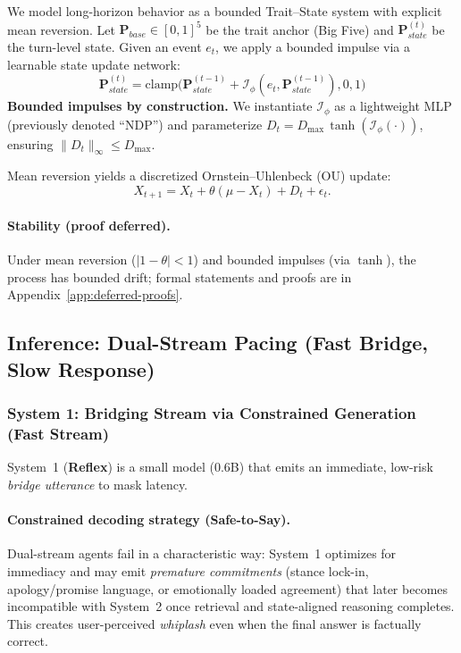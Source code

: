 \documentclass{article}
\begin{document}
We model long-horizon behavior as a bounded Trait--State system with explicit mean reversion.
Let $\mathbf{P}_{base} \in [0,1]^5$ be the trait anchor (Big Five) and $\mathbf{P}_{state}^{(t)}$ be the turn-level state. Given an event $e_t$, we apply a bounded impulse via a learnable state update network:
\begin{equation}
    \mathbf{P}_{state}^{(t)} = \text{clamp}\big(\mathbf{P}_{state}^{(t-1)} + \mathcal{I}_\phi(e_t, \mathbf{P}_{state}^{(t-1)}), 0, 1\big)
    \label{eq:state-impulse}
\end{equation}
\textbf{Bounded impulses by construction.} We instantiate $\mathcal{I}_\phi$ as a lightweight MLP (previously denoted ``NDP'') and parameterize $D_t = D_{\max}\,\tanh(\mathcal{I}_\phi(\cdot))$, ensuring $\|D_t\|_\infty\le D_{\max}$.

Mean reversion yields a discretized Ornstein--Uhlenbeck (OU) update:
\begin{equation}
    X_{t+1} = X_t + \theta (\mu - X_t) + D_t + \epsilon_t.
    \label{eq:ou-discrete}
\end{equation}

\paragraph{Stability (proof deferred).}
Under mean reversion ($|1-\theta|<1$) and bounded impulses (via $\tanh$), the process has bounded drift; formal statements and proofs are in Appendix~\ref{app:deferred-proofs}.

\subsection{Inference: Dual-Stream Pacing (Fast Bridge, Slow Response)}
\label{sec:dual-stream}

\subsubsection{System 1: Bridging Stream via Constrained Generation (Fast Stream)}
System~1 (\textbf{Reflex}) is a small model (0.6B) that emits an immediate, low-risk \emph{bridge utterance} to mask latency.

\paragraph{Constrained decoding strategy (Safe-to-Say).}
Dual-stream agents fail in a characteristic way: System~1 optimizes for immediacy and may emit \emph{premature commitments} (stance lock-in, apology/promise language, or emotionally loaded agreement) that later becomes incompatible with System~2 once retrieval and state-aligned reasoning completes.
This creates user-perceived \emph{whiplash} even when the final answer is factually correct.
\end{document}
